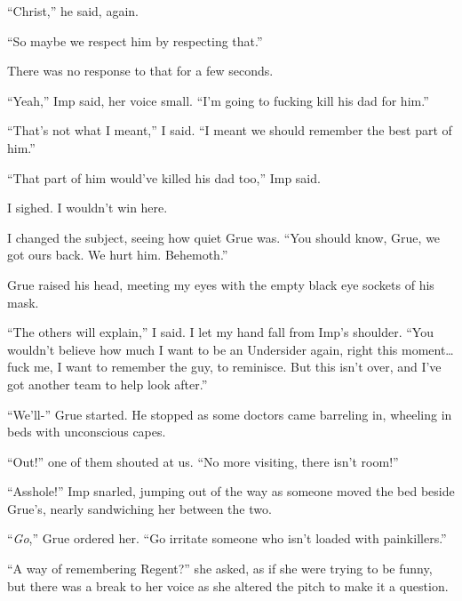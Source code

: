 ``Christ,'' he said, again.



``So maybe we respect him by respecting that.''



There was no response to that for a few seconds.



``Yeah,'' Imp said, her voice small.  ``I'm going to fucking kill his dad for him.''



``That's not what I meant,'' I said.  ``I meant we should remember the best part of him.''



``That part of him would've killed his dad too,'' Imp said.



I sighed.  I wouldn't win here.



I changed the subject, seeing how quiet Grue was.  ``You should know, Grue, we got ours back.  We hurt him.  Behemoth.''



Grue raised his head, meeting my eyes with the empty black eye sockets of his mask.



``The others will explain,'' I said.  I let my hand fall from Imp's shoulder.  ``You wouldn't believe how much I want to be an Undersider again, right this moment\ldots fuck me, I want to remember the guy, to reminisce.  But this isn't over, and I've got another team to help look after.''



``We'll-''  Grue started.  He stopped as some doctors came barreling in, wheeling in beds with unconscious capes.



``Out!'' one of them shouted at us.  ``No more visiting, there isn't room!''



``Asshole!'' Imp snarled, jumping out of the way as someone moved the bed beside Grue's, nearly sandwiching her between the two.



``\emph{Go},'' Grue ordered her.  ``Go irritate someone who isn't loaded with painkillers.''



``A way of remembering Regent?'' she asked, as if she were trying to be funny, but there was a break to her voice as she altered the pitch to make it a question.



